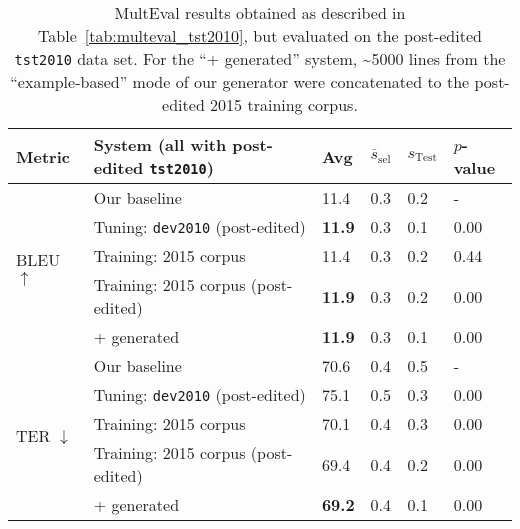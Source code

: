 {%
\begin{table}[htb]
\begin{center}
\begin{tabular}{|l|l|l|l|l|l|}
\hline
\bf Metric & \bf System (all with post-edited {\small \tt tst2010}) & \bf Avg & \bf $\overline{s}_{\text{sel}}$ & \bf $s_{\text{Test}}$ & \bf $p$-value \\
\hline
\multirow{5}{*}{BLEU $\uparrow$}
& Our baseline & 11.4 & 0.3 & 0.2 & - \\
& Tuning: {\small \tt dev2010} (post-edited) & \textbf{11.9} & 0.3 & 0.1 & 0.00 \\
& Training: 2015 corpus & 11.4 & 0.3 & 0.2 & 0.44 \\
& Training: 2015 corpus (post-edited) & \textbf{11.9} & 0.3 & 0.2 & 0.00 \\
& + generated & \textbf{11.9} & 0.3 & 0.1 & 0.00 \\ 
\hline
\multirow{5}{*}{TER $\downarrow$}
& Our baseline & 70.6 & 0.4 & 0.5 & - \\
& Tuning: {\small \tt dev2010} (post-edited) & 75.1 & 0.5 & 0.3 & 0.00 \\
& Training: 2015 corpus & 70.1 & 0.4 & 0.3 & 0.00 \\
& Training: 2015 corpus (post-edited) & 69.4 & 0.4 & 0.2 & 0.00 \\
& + generated & \textbf{69.2} & 0.4 & 0.1 & 0.00 \\ 
\hline
\end{tabular}
\end{center}

\caption{\label{tab:multeval_tst2010_fixed} %
MultEval results obtained as described in Table~\ref{tab:multeval_tst2010}, but evaluated on the post-edited {\small \tt tst2010} data set.
For the ``+ generated'' system, \textasciitilde 5000 lines from the ``example-based'' mode of our generator were concatenated to the post-edited 2015 training corpus.
} %
\end{table}

}
